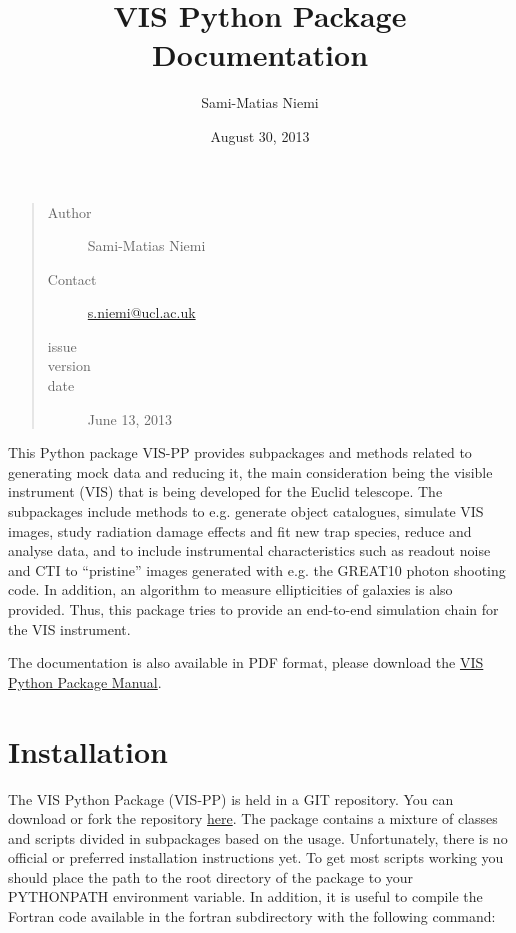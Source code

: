 \documentclass[a4paper,11pt,english]{sphinxmanual}
\title{VIS Python Package Documentation}
\date{August 30, 2013}
\author{Sami-Matias Niemi}
\begin{document}
\maketitle
\tableofcontents
{}\label{index::doc}

\begin{quote}\begin{description}
\item[{Author}] \leavevmode
Sami-Matias Niemi

\item[{Contact}] \leavevmode
\href{mailto:s.niemi@ucl.ac.uk}{s.niemi@ucl.ac.uk}

\item[{issue}] 

\item[{version}] 

\item[{date}] \leavevmode
June 13, 2013

\end{description}\end{quote}

This Python package VIS-PP provides subpackages and methods related to generating mock data and reducing it, the main
consideration being the visible instrument (VIS) that is being developed for the Euclid telescope.
The subpackages include methods to e.g. generate object catalogues, simulate VIS images,
study radiation damage effects and fit new trap species, reduce and analyse data, and to include instrumental
characteristics such as readout noise and CTI to ``pristine'' images generated with e.g. the GREAT10 photon
shooting code. In addition, an algorithm to measure ellipticities of galaxies is also provided. Thus,
this package tries to provide an end-to-end simulation chain for the VIS instrument.

The documentation is also available in PDF format, please download the \href{https://www.mssl.ucl.ac.uk/~smn2/Manual.pdf}{VIS Python Package Manual}.


\chapter{Installation}
\label{index:welcome-to-euclid-visible-instrument-vis-python-package-vis-pp-documentation}\label{index:installation}
The VIS Python Package (VIS-PP) is held in a GIT repository. You can download or fork the repository
\href{https://bitbucket.org/niemi/vissim-python/overview}{here}. The package contains a mixture of classes
and scripts divided in subpackages based on the usage. Unfortunately, there is no official or preferred
installation instructions yet. To get most scripts working you should place
the path to the root directory of the package to your PYTHONPATH environment variable. In addition, it is
useful to compile the Fortran code available in the fortran subdirectory with the following command:
\end{document}

